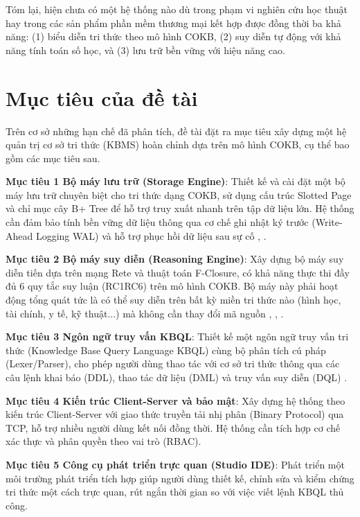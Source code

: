 \documentclass[13pt,a4paper,oneside]{extreport}
\begin{document}
Tóm lại, hiện chưa có một hệ thống nào  dù trong phạm vi nghiên cứu học thuật hay trong các sản phẩm phần mềm thương mại  kết hợp được đồng thời ba khả năng: (1) biểu diễn tri thức theo mô hình COKB, (2) suy diễn tự động với khả năng tính toán số học, và (3) lưu trữ bền vững với hiệu năng cao.


\section{Mục tiêu của đề tài}


Trên cơ sở những hạn chế đã phân tích, đề tài đặt ra mục tiêu xây dựng một hệ quản trị cơ sở tri thức (KBMS) hoàn chỉnh dựa trên mô hình COKB, cụ thể bao gồm các mục tiêu sau.


\textbf{Mục tiêu 1  Bộ máy lưu trữ (Storage Engine)}: Thiết kế và cài đặt một bộ máy lưu trữ chuyên biệt cho tri thức dạng COKB, sử dụng cấu trúc Slotted Page và chỉ mục cây B+ Tree để hỗ trợ truy xuất nhanh trên tập dữ liệu lớn. Hệ thống cần đảm bảo tính bền vững dữ liệu thông qua cơ chế ghi nhật ký trước (Write-Ahead Logging  WAL) và hỗ trợ phục hồi dữ liệu sau sự cố \cite{DatabaseSystems}, \cite{ComerBTree}.


\textbf{Mục tiêu 2  Bộ máy suy diễn (Reasoning Engine)}: Xây dựng bộ máy suy diễn tiến dựa trên mạng Rete và thuật toán F-Closure, có khả năng thực thi đầy đủ 6 quy tắc suy luận (RC1RC6) trên mô hình COKB. Bộ máy này phải hoạt động tổng quát  tức là có thể suy diễn trên bất kỳ miền tri thức nào (hình học, tài chính, y tế, kỹ thuật...) mà không cần thay đổi mã nguồn \cite{DoVanNhon1}, \cite{RussellNorvig}, \cite{ReteAlgorithm}.


\textbf{Mục tiêu 3  Ngôn ngữ truy vấn KBQL}: Thiết kế một ngôn ngữ truy vấn tri thức (Knowledge Base Query Language  KBQL) cùng bộ phân tích cú pháp (Lexer/Parser), cho phép người dùng thao tác với cơ sở tri thức thông qua các câu lệnh khai báo (DDL), thao tác dữ liệu (DML) và truy vấn suy diễn (DQL) \cite{RussellNorvig}.


\textbf{Mục tiêu 4  Kiến trúc Client-Server và bảo mật}: Xây dựng hệ thống theo kiến trúc Client-Server với giao thức truyền tải nhị phân (Binary Protocol) qua TCP, hỗ trợ nhiều người dùng kết nối đồng thời. Hệ thống cần tích hợp cơ chế xác thực và phân quyền theo vai trò (RBAC).


\textbf{Mục tiêu 5  Công cụ phát triển trực quan (Studio IDE)}: Phát triển một môi trường phát triển tích hợp giúp người dùng thiết kế, chỉnh sửa và kiểm chứng tri thức một cách trực quan, rút ngắn thời gian so với việc viết lệnh KBQL thủ công.
\end{document}
